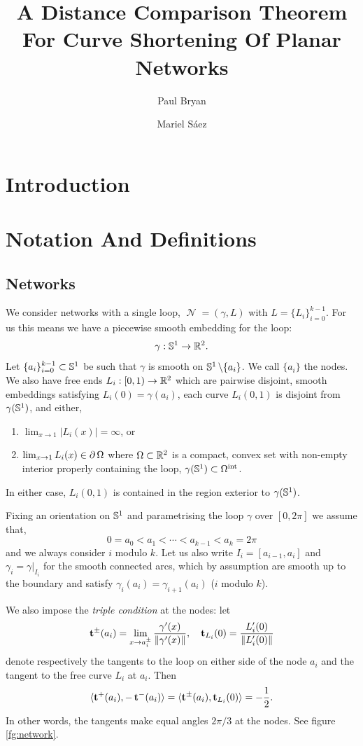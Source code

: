 \documentclass[11pt]{amsart}
\author{Paul Bryan}
\author{Mariel S\'aez}
\date{}
\title[Dist. comp. for CSF networks]{A Distance Comparison Theorem For Curve Shortening Of Planar Networks}
\DeclareMathOperator{\network}{\mathcal{N}}
\begin{document}
\maketitle

\section{Introduction}
\label{sec:orgheadline1}
\section{Notation And Definitions}
\label{sec:orgheadline5}

\subsection{Networks}
\label{sec:orgheadline2}

We consider networks with a single loop, \(\network = (\gamma, L)\) with \(L = \{L_i\}_{i=0}^{k-1}\). For us this means we have a piecewise smooth embedding for the loop:
\[
\gamma : \mathbb{S}^1 \to \mathbb{R}^2.
\]
Let \(\{a_i\}_{i=0}^{k-1} \subset \mathbb{S}^1\) be such that \(\gamma\) is smooth on \(\mathbb{S}^1 \operatorname{\backslash} \{a_i\}\). We call \(\{a_i\}\) the nodes. We also have free ends \(L_i : [0, 1) \to \mathbb{R}^2\) which are pairwise disjoint, smooth embeddings satisfying \(L_i(0) = \gamma(a_i)\), each curve \(L_i(0, 1)\) is disjoint from \(\gamma(\mathbb{S}^1)\), and either,
\begin{enumerate}
\item \(\lim_{x\to 1} |L_i(x)| = \infty\), or
\item \(\lim_{x\to 1} L_i(x) \in \operatorname{\partial}{\Omega}\) where \(\Omega \subset \mathbb{R}^2\) is a compact, convex set with non-empty interior properly containing the loop, \(\gamma(\mathbb{S}^1) \subset {\Omega}^{\text{int}}\).
\end{enumerate}
In either case, \(L_i(0,1)\) is contained in the region exterior to \(\gamma(\mathbb{S}^1)\).

Fixing an orientation on \(\mathbb{S}^1\) and parametrising the loop \(\gamma\) over \([0, 2\pi]\) we assume that,
\[
0 = a_0 < a_1 < \cdots < a_{k-1} < a_k = 2\pi
\]
and we always consider \(i\) modulo \(k\). Let us also write \(I_i = [a_{i-1}, a_i]\) and \(\gamma_i = \gamma|_{I_i}\) for the smooth connected arcs, which by assumption are smooth up to the boundary and satisfy \(\gamma_i(a_i) = \gamma_{i+1}(a_i)\) (\(i\) modulo \(k\)).

We also impose the \emph{triple condition} at the nodes: let
\[
\operatorname{\mathbf{t}}^{\pm} (a_i) = \lim_{x\to a_i^{\pm}} \frac{\gamma'(x)}{\|\gamma'(x)\|}, \quad \operatorname{\mathbf{t}}_{L_i}(0) = \frac{L_i'(0)}{\|L_i'(0)\|}
\]
denote respectively the tangents to the loop on either side of the node \(a_i\) and the tangent to the free curve \(L_i\) at \(a_i\). Then
\begin{equation}
\label{eq:triplecondition}
\langle{\operatorname{\mathbf{t}}^+(a_i)},{-\operatorname{\mathbf{t}}^-(a_i)}\rangle = \langle{\operatorname{\mathbf{t}}^{\pm}(a_i)},{\operatorname{\mathbf{t}}_{L_i}(0)}\rangle = - \frac{1}{2}.
\end{equation}
In other words, the tangents make equal angles \(2\pi/3\) at the nodes. See figure \ref{fg:network}.
\end{document}
